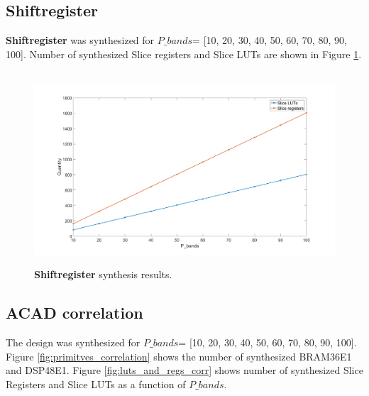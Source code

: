 \subsection{Shiftregister}
\textbf{Shiftregister} was synthesized for $P\_bands$= [10, 20, 30, 40, 50, 60, 70, 80, 90, 100]. Number of synthesized Slice registers and Slice LUTs are shown in Figure \ref{fig:primitives_shiftregister}. 

\begin{figure}[H]

\hbox{\hspace*{-2cm}                                                           
   \includegraphics[scale=0.3]{images/syntese_resultat/shiftregister.png}}
  \caption{\textbf{Shiftregister} synthesis results.  } 
  \label{fig:primitives_shiftregister}
\end{figure}

\subsection{ACAD correlation}

The design was synthesized for $P\_bands$= [10, 20, 30, 40, 50, 60, 70, 80, 90, 100]. Figure \ref{fig:primitves_correlation}  shows the number of synthesized BRAM36E1 and DSP48E1. Figure \ref{fig:luts_and_regs_corr} shows number of synthesized Slice Registers and Slice LUTs as a function of $P\_bands$.

